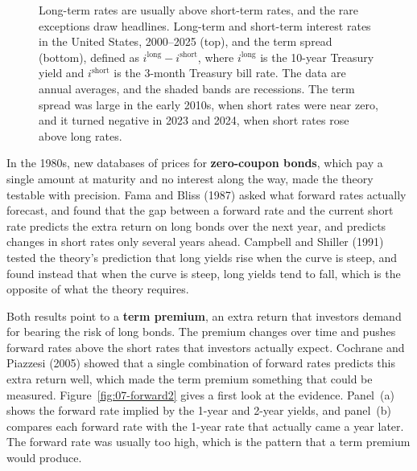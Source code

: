 \begin{figure}[htbp]
{%
}
\caption{Long-term rates are usually above short-term rates, and the rare exceptions draw headlines. Long-term and short-term interest rates in the United States, 2000--2025 (top), and the term spread (bottom), defined as $i^{\mathrm{long}} - i^{\mathrm{short}}$, where $i^{\mathrm{long}}$ is the 10-year Treasury yield and $i^{\mathrm{short}}$ is the 3-month Treasury bill rate. The data are annual averages, and the shaded bands are recessions. The term spread was large in the early 2010s, when short rates were near zero, and it turned negative in 2023 and 2024, when short rates rose above long rates.}
\label{fig:07-long-short}
\end{figure}

In the 1980s, new databases of prices for \textbf{zero-coupon bonds}, which pay a single amount at maturity and no interest along the way, made the theory testable with precision. Fama and Bliss (1987) asked what forward rates actually forecast, and found that the gap between a forward rate and the current short rate predicts the extra return on long bonds over the next year, and predicts changes in short rates only several years ahead. Campbell and Shiller (1991) tested the theory's prediction that long yields rise when the curve is steep, and found instead that when the curve is steep, long yields tend to fall, which is the opposite of what the theory requires. 

Both results point to a \textbf{term premium}, an extra return that investors demand for bearing the risk of long bonds. The premium changes over time and pushes forward rates above the short rates that investors actually expect. Cochrane and Piazzesi (2005) showed that a single combination of forward rates predicts this extra return well, which made the term premium something that could be measured. Figure~\ref{fig:07-forward2} gives a first look at the evidence. Panel~(a) shows the forward rate implied by the 1-year and 2-year yields, and panel~(b) compares each forward rate with the 1-year rate that actually came a year later. The forward rate was usually too high, which is the pattern that a term premium would produce.

